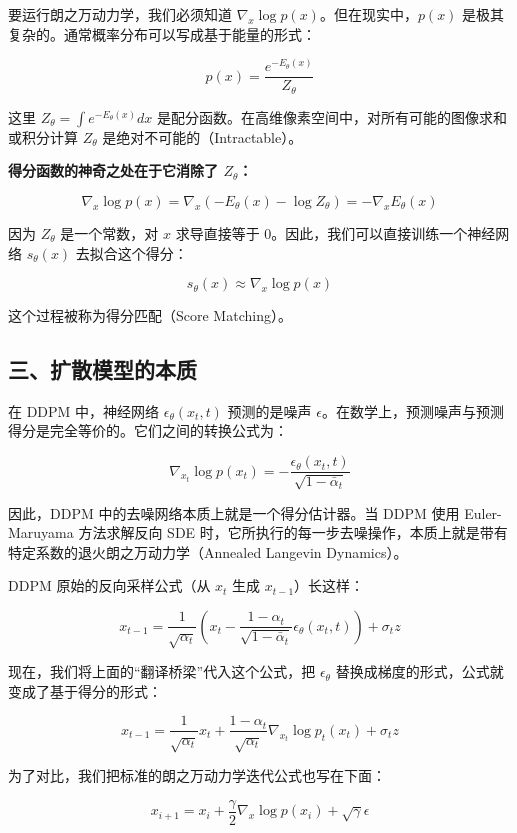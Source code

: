 要运行朗之万动力学，我们必须知道 \(\nabla_x\log p(x)\)。但在现实中，\(p(x)\) 是极其复杂的。通常概率分布可以写成基于能量的形式：

\[
p(x)=\frac{e^{-E_\theta(x)}}{Z_\theta}
\]

这里 \(Z_\theta=\int e^{-E_\theta(x)}dx\) 是配分函数。在高维像素空间中，对所有可能的图像求和或积分计算 \(Z_\theta\) 是绝对不可能的（Intractable）。

\textbf{得分函数的神奇之处在于它消除了 \(Z_\theta\)：}

\[
\nabla_x\log p(x)=\nabla_x(-E_\theta(x)-\log Z_\theta)=-\nabla_x E_\theta(x)
\]

因为 \(Z_\theta\) 是一个常数，对 \(x\) 求导直接等于 0。因此，我们可以直接训练一个神经网络 \(s_\theta(x)\) 去拟合这个得分：

\[
s_\theta(x)\approx\nabla_x\log p(x)
\]

这个过程被称为得分匹配（Score Matching）。

\hypertarget{ux4e09ux6269ux6563ux6a21ux578bux7684ux672cux8d28}{%
\subsection{三、扩散模型的本质}\label{ux4e09ux6269ux6563ux6a21ux578bux7684ux672cux8d28}}

在 DDPM 中，神经网络 \(\epsilon_\theta(x_t,t)\) 预测的是噪声 \(\epsilon\)。在数学上，预测噪声与预测得分是完全等价的。它们之间的转换公式为：

\[
\nabla_{x_t}\log p(x_t)=-\frac{\epsilon_\theta(x_t,t)}{\sqrt{1-\bar{\alpha}_t}}
\]

因此，DDPM 中的去噪网络本质上就是一个得分估计器。当 DDPM 使用 Euler-Maruyama 方法求解反向 SDE 时，它所执行的每一步去噪操作，本质上就是带有特定系数的退火朗之万动力学（Annealed Langevin Dynamics）。

DDPM 原始的反向采样公式（从 \(x_t\) 生成 \(x_{t-1}\)）长这样：

\[
x_{t-1}=\frac{1}{\sqrt{\alpha_t}}
\left(x_t-\frac{1-\alpha_t}{\sqrt{1-\bar{\alpha}_t}}\epsilon_\theta(x_t,t)\right)
+\sigma_t z
\]

现在，我们将上面的``翻译桥梁''代入这个公式，把 \(\epsilon_\theta\) 替换成梯度的形式，公式就变成了基于得分的形式：

\[
x_{t-1}=\frac{1}{\sqrt{\alpha_t}}x_t
+\frac{1-\alpha_t}{\sqrt{\alpha_t}}\nabla_{x_t}\log p_t(x_t)
+\sigma_t z
\]

为了对比，我们把标准的朗之万动力学迭代公式也写在下面：

\[
x_{i+1}=x_i+\frac{\gamma}{2}\nabla_x\log p(x_i)+\sqrt{\gamma}\epsilon
\]

